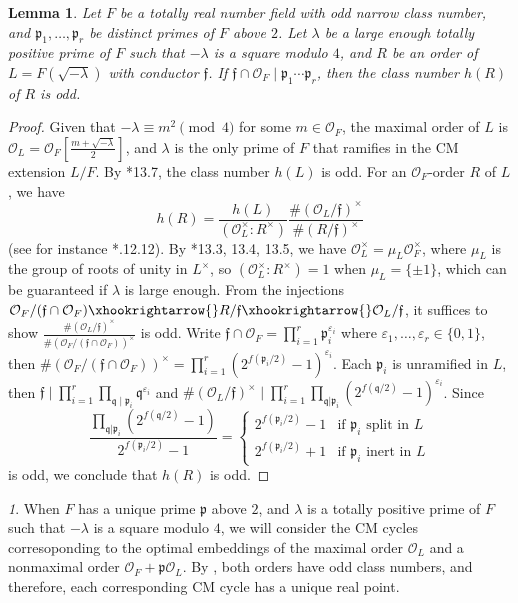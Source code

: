 \documentclass{amsart}
\numberwithin{equation}{subsection}
\numberwithin{theorem}{section}
\newtheorem{lemma}[theorem]{Lemma}
\theoremstyle{definition}
\theoremstyle{remark}
\newtheorem{para}[theorem]{}
\newcommand{\cO}{\mathcal{O}}
\newcommand{\fp}{\mathfrak{p}}
\newcommand{\fq}{\mathfrak{q}}
\begin{document}
\begin{lemma}\label{lem:classnumber}
    Let $F$ be a totally real number field with odd narrow class number, and $\fp_1, \dotsc, \fp_r$ be distinct primes of $F$ above $2$. Let $\lambda$ be a large enough totally positive prime of $F$ such that $-\lambda$ is a square modulo $4$, and $R$ be an order of $L = F(\sqrt{-\lambda})$ with conductor $\mathfrak{f}$. If $\mathfrak{f}\cap \cO_F \mid \fp_1\cdots \fp_r$, then the class number $h(R)$ of $R$ is odd. 
\end{lemma}
\begin{proof}
    Given that $-\lambda \equiv m^2 \pmod4$ for some $m\in \mathcal{O}_F$, the maximal order of $L$ is $\cO_L = \cO_F[\frac{m+\sqrt{-\lambda}}{2}]$, and $\lambda$ is the only prime of $F$ that ramifies in the CM extension $L/F$. By \cite{MR963648}*{13.7}, the class number $h(L)$ is odd. 
    For an $\cO_F$-order $R$ of $L$, we have 
    \[h(R) = \frac{h(L)}{(\mathcal{O}_L^\times : R^\times)} \frac{\#(\mathcal{O}_L/\mathfrak{f})^\times}{\#(R/\mathfrak{f})^\times}\](see for instance \cite{MR1697859}*{\MakeUppercase{}.12.12}). By \cite{MR963648}*{13.3, 13.4, 13.5}, we have $\cO_L^\times = \mu_L\cO_F^\times$, where $\mu_L$ is the group of roots of unity in $L^\times$, so $(\cO_L^\times:R^\times) = 1$ when $\mu_L = \{\pm1\}$, which can be guaranteed if $\lambda$ is large enough.  
    From the injections $\cO_F/(\mathfrak{f}\cap \cO_F)\xhookrightarrow{}R/\mathfrak{f} \xhookrightarrow{}\cO_L/\mathfrak{f}$, it suffices to show $\frac{\#(\mathcal{O}_L/\mathfrak{f})^\times}{\#(\cO_F/(\mathfrak{f}\cap \cO_F))^\times}$ is odd. 
    Write $\mathfrak{f}\cap \cO_F = \prod_{i=1}^r\fp_i^{\varepsilon_i}$ where $\varepsilon_1, \dotsc, \varepsilon_r\in\{0,1\}$, then  $\#(\mathcal{O}_F / (\mathfrak{f}\cap \cO_F))^\times = \prod_{i=1}^r(2^{f(\fp_i/2)} - 1)^{\varepsilon_i}$. Each $\fp_i$ is unramified in $L$, then $\mathfrak{f} \mid \prod_{i=1}^r \prod_{\fq \mid \fp_i} \fq^{\varepsilon_i}$ and $\#(\mathcal{O}_L / \mathfrak{f})^\times \mid \prod_{i=1}^r\prod_{\fq|\fp_i}(2^{f(\fq/2)} - 1)^{\varepsilon_i}$. Since \[\frac{\prod_{\fq|\fp_i}(2^{f(\fq/2)} - 1)}{2^{f(\fp_i/2)} - 1} = \begin{cases}
        2^{f(\fp_i/2)} - 1& \text{if }\fp_i\text{ split in }L \\
        2^{f(\fp_i/2)} + 1& \text{if }\fp_i\text{ inert in }L
    \end{cases}\] is odd, we conclude that $h(R)$ is odd. 
\end{proof}
\begin{para} \label{order}
    When $F$ has a unique prime $\fp$ above $2$, and $\lambda$ is a totally positive prime of $F$ such that $-\lambda$ is a square modulo $4$, we will consider the CM cycles corresoponding to the optimal embeddings of the maximal order $\cO_{L}$ and a nonmaximal order $\cO_{F}+\fp\cO_L$. By  , both orders have odd class numbers, and therefore, each corresponding CM cycle has a unique real point. 
\end{para}
\end{document}
